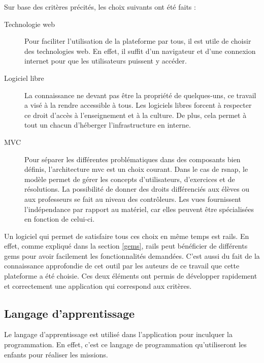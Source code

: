 Sur base des critères précités, les choix suivants ont été faits :
\begin{description}
  \item[Technologie web] Pour faciliter l'utilisation de la plateforme par tous, il est utile de choisir des technologies web. En effet, il suffit d'un navigateur et d'une connexion internet pour que les utilisateurs puissent y accéder.
  \item[Logiciel libre] La connaissance ne devant pas être la propriété de quelques-uns, ce travail a visé à la rendre accessible à tous. Les logiciels libres forcent à respecter ce droit d'accès à l'enseignement et à la culture. De plus, cela permet à tout un chacun d'héberger l'infrastructure en interne.
  \item[MVC] Pour séparer les différentes problématiques dans des composants bien définis, l'architecture \gls{mvc} est un choix courant. Dans le cas de \gls{rsnap}, le modèle permet de gérer les concepts d'utilisateurs, d'exercices et de résolutions. La possibilité de donner des droits différenciés aux élèves ou aux professeurs se fait au niveau des contrôleurs. Les vues fournissent l'indépendance par rapport au matériel, car elles peuvent être spécialisées en fonction de celui-ci.
\end{description}
Un logiciel qui permet de satisfaire tous ces choix en même temps est \gls{rails}. En effet, comme expliqué dans la section \ref{gems}, \gls{rails} peut bénéficier de différents \glspl{gem}  pour avoir facilement les fonctionnalités demandées. C'est aussi du fait de la connaissance approfondie de cet outil par les auteurs de ce travail que cette plateforme a été choisie. Ces deux éléments ont permis de développer rapidement et correctement une application qui correspond aux critères.

\subsection{Langage d'apprentissage}
Le langage d'apprentissage est utilisé dans l'application pour inculquer la programmation. En effet, c'est ce langage de programmation qu'utiliseront les enfants pour réaliser les \glspl{mission}.

